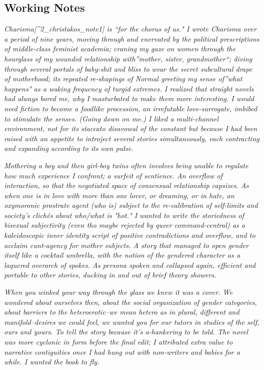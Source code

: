 \documentclass[
]{memoir}
\begin{document}
\hypertarget{working-notes-1}{%
\subsection*{Working Notes}\label{working-notes-1}}

\emph{Charisma{[}\^{}2\_christakos\_note1{]} is ``for the chorus of us."
I wrote Charisma over a period of nine years, moving through and
enervated by the political prescriptions of middle-class feminist
academia; craning my gaze on women through the hourglass of my wounded
relationship with''mother, sister, grandmother``; diving through several
portals of baby-shit and bliss to wear the secret subcultural drape of
motherhood; its repeated re-shapings of Normal greeting my sense
of''what happens" as a waking frequency of turgid extremes. I realized
that straight novels had always bored me, why I masturbated to make them
more interesting. I would need fiction to become a foodlike procession,
an irrefutable love-surrogate, imbibed to stimulate the senses. (Going
down on me.) I liked a multi-channel environment, not for its staccato
disavowal of the constant but because I had been raised with an appetite
to introject several stories simultaneously, each contracting and
expanding according to its own pulse.}

\emph{Mothering a boy and then girl-boy twins often involves being
unable to regulate how much experience I confront; a surfeit of
sentience. An overflow of interaction, so that the negotiated space of
consensual relationship capsizes. As when one is in love with more than
one lover, or dreaming, or in hate, an oxymoronic prostrate agent (who
is) subject to the re-calibration of self-limits and society's clichés
about who/what is "hot." I wanted to write the storiedness of bisexual
subjectivity (even tho maybe rejected by queer command-central) as a
kaleidoscopic inner identity script of positive contradictions and
overflow, and to acclaim cunt-agency for mother subjects. A story that
managed to open gender itself like a cocktail umbrella, with the notion
of the gendered character as a laquered overarch of spokes. As persona
spoken and collapsed again, efficient and portable to other stories,
ducking in and out of brief theory showers.}

\emph{When you winked your way through the glass we knew it was a cover.
We wondered about ourselves then, about the social organization of
gender categories, about barriers to the heteroerotic--we mean hetero as
in plural, different and manifold--desires we could feel, we wanted you
for our tutors in studies of the self, ours and yours. To tell the story
because it's a-hankering to be told. The novel was more cyclonic in form
before the final edit; I attributed extra value to narrative
contiguities once I had hung out with non-writers and babies for a
while. I wanted the book to fly.}
\end{document}
